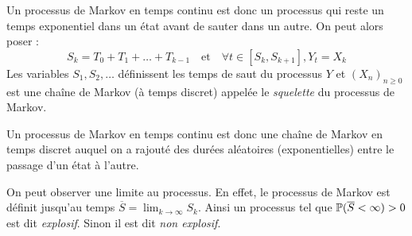 \begin{proposition}
    Un processus de Markov en temps continu est donc un processus qui reste un temps exponentiel dans un état 
    avant de sauter dans un autre. On peut alors poser : 
        $$ S_k = T_0 + T_1 + \dots + T_{k-1} \quad \text{et} \quad \forall t \in [S_k, S_{k+1}], Y_t = X_k $$
    Les variables $S_1, S_2, \dots$ définissent les temps de saut du processus $Y$ et $(X_n)_{n \geqslant 0}$
    est une chaîne de Markov (à temps discret) appelée le \emph{squelette} du processus de Markov. 
    
    \begin{center}
    \end{center}
    Un processus de Markov en temps continu est donc une chaîne de Markov en temps discret auquel on 
    a rajouté des durées aléatoires (exponentielles) entre le passage d'un état à l'autre.
    
    On peut observer une limite au processus. En effet, le processus de Markov est définit jusqu'au temps $ \overline{S} = \lim_{k \to \infty} S_k$. 
    Ainsi un processus tel que $ \mathbb{P}( \overline{S} < \infty) > 0$ est dit \emph{explosif}. Sinon il est dit \emph{non explosif}. 
\end{proposition}

